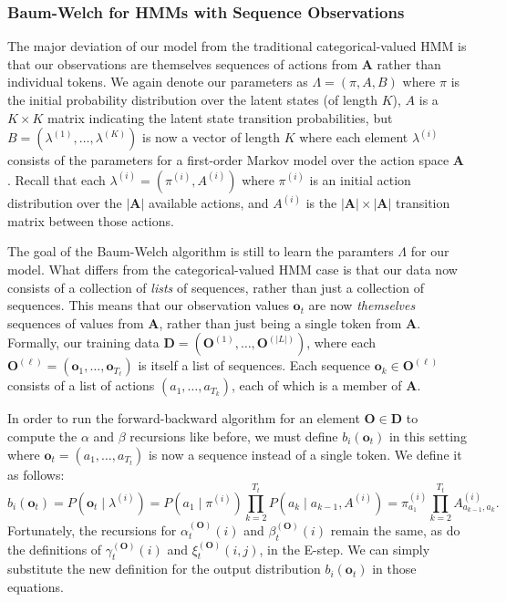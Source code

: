 \subsubsection{Baum-Welch for HMMs with Sequence Observations}
The major deviation of our model from the traditional categorical-valued
HMM is that our observations are themselves sequences of actions from
$\mathbf{A}$ rather than individual tokens. We again denote our parameters
as $\Lambda = (\pi, A, B)$ where $\pi$ is the initial probability
distribution over the latent states (of length $K$), $A$ is a $K \times K$
matrix indicating the latent state transition probabilities, but $B =
(\lambda^{(1)}, \ldots, \lambda^{(K)})$ is now a vector of length $K$ where
each element $\lambda^{(i)}$ consists of the parameters for a first-order
Markov model over the action space $\mathbf{A}$. Recall that each
$\lambda^{(i)} = (\pi^{(i)}, A^{(i)})$ where $\pi^{(i)}$ is an initial
action distribution over the $|\mathbf{A}|$ available actions, and
$A^{(i)}$ is the $|\mathbf{A}| \times |\mathbf{A}|$ transition matrix
between those actions.

The goal of the Baum-Welch algorithm is still to learn the paramters
$\Lambda$ for our model. What differs from the categorical-valued HMM case
is that our data now consists of a collection of \emph{lists} of sequences,
rather than just a collection of sequences. This means that our observation
values $\mathbf{o}_t$ are now \emph{themselves} sequences of values from
$\mathbf{A}$, rather than just being a single token from $\mathbf{A}$.
Formally, our training data $\mathbf{D} = (\mathbf{O}^{(1)}, \ldots,
\mathbf{O}^{(|L|)})$, where each $\mathbf{O}^{(\ell)} = (\mathbf{o}_1,
\ldots, \mathbf{o}_{T_\ell})$ is itself a list of sequences. Each sequence
$\mathbf{o}_k \in \mathbf{O}^{(\ell)}$ consists of a list of actions $(a_1,
\ldots, a_{T_k})$, each of which is a member of $\mathbf{A}$.

In order to run the forward-backward algorithm for an element $\mathbf{O}
\in \mathbf{D}$ to compute the $\alpha$ and $\beta$ recursions like before,
we must define $b_i(\mathbf{o}_t)$ in this setting where $\mathbf{o}_t =
(a_1, \ldots, a_{T_t})$ is now a sequence instead of a single token. We
define it as follows:
\begin{equation}
  b_i(\mathbf{o}_t) = P(\mathbf{o}_t \mid \lambda^{(i)})
  = P(a_1 \mid \pi^{(i)}) \prod_{k=2}^{T_t} P(a_k \mid a_{k-1}, A^{(i)})
  = \pi^{(i)}_{a_1} \prod_{k=2}^{T_t} A^{(i)}_{a_{k-1},a_{k}}.
\end{equation}
Fortunately, the recursions for $\alpha^{(\mathbf{O})}_t(i)$ and
$\beta^{(\mathbf{O})}_t(i)$ remain the same, as do the definitions of
$\gamma^{(\mathbf{O})}_t(i)$ and $\xi^{(\mathbf{O})}_t(i,j)$, in the
E-step. We can simply substitute the new definition for the output
distribution $b_i(\mathbf{o}_t)$ in those equations.

